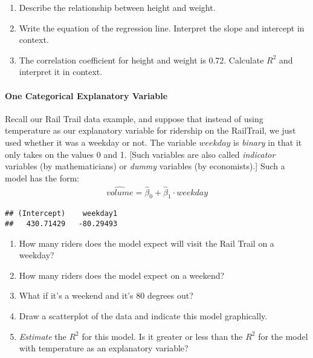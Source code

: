 \documentclass[10pt]{article}\usepackage[]{graphicx}\usepackage[]{color}
\makeatletter
\newenvironment{kframe}{%
 \def\at@end@of@kframe{}%
 \ifinner\ifhmode%
  \def\at@end@of@kframe{\end{minipage}}%
  \begin{minipage}{\columnwidth}%
 \fi\fi%
 \def\FrameCommand##1{\hskip\@totalleftmargin \hskip-\fboxsep
 \colorbox{shadecolor}{##1}\hskip-\fboxsep
     \hskip-\linewidth \hskip-\@totalleftmargin \hskip\columnwidth}%
 \MakeFramed {\advance\hsize-\width
   \@totalleftmargin\z@ \linewidth\hsize
   \@setminipage}}%
 {\par\unskip\endMakeFramed%
 \at@end@of@kframe}
\newenvironment{knitrout}{}{} %
\makeatother
\begin{document}
\begin{enumerate}
  \itemsep0.7in
\item Describe the relationship between height and weight.
\item Write the equation of the regression line. Interpret the slope and intercept in context.
\item The correlation coefficient for height and weight is 0.72. Calculate $R^2$ and interpret it in context.
  \vspace{0.5in}
\end{enumerate}


\clearpage
\paragraph{One Categorical Explanatory Variable}

Recall our Rail Trail data example, and suppose that instead of using temperature as our explanatory variable for ridership on the RailTrail, we just used whether it was a weekday or not. The variable $weekday$ is \emph{binary} in that it only takes on the values 0 and 1. [Such variables are also called \emph{indicator} variables (by mathematicians) or \emph{dummy} variables (by economists).] Such a model has the form:
\begin{eqnarray*}
  \widehat{volume} = \hat{\beta}_0 + \hat{\beta}_1 \cdot weekday
\end{eqnarray*}

\begin{knitrout}\footnotesize
{}\color{fgcolor}\begin{kframe}
\begin{verbatim}
## (Intercept)    weekday1 
##   430.71429   -80.29493
\end{verbatim}
\end{kframe}
\end{knitrout}

\begin{enumerate}
  \itemsep0.5in
  \item How many riders does the model expect will visit the Rail Trail on a weekday? 
  \item How many riders does the model expect on a weekend? 
  \item What if it's a weekend and it's 80 degrees out?
  \item Draw a scatterplot of the data and indicate this model graphically.
  \item \emph{Estimate} the $R^2$ for this model. Is it greater or less than the $R^2$ for the model with temperature as an explanatory variable?
\end{enumerate}
\end{document}
